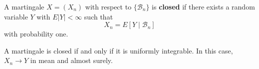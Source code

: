 A martingale $X = (X_n)$ with respect to $\{\mathcal{B}_n\}$ is \textbf{closed} if there exists a random variable $Y$ with $E|Y| < \infty$ such that
$$X_n = E[Y \mid \mathcal{B}_n]$$
with probability one.

A martingale is closed if and only if it is uniformly integrable. In this case, $X_n \to Y$ in mean and almost surely.
